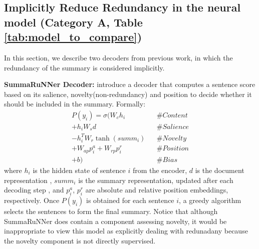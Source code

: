 \documentclass[11pt,a4paper]{article}
\begin{document}
\subsection{Implicitly Reduce Redundancy in the neural model (Category A, Table \ref{tab:model_to_compare})}
In this section, we describe two decoders from previous work, in which the redundancy of the summary is considered implicitly.


\textbf{SummaRuNNer Decoder:}
 introduce
a decoder that computes a sentence score based on its salience, novelty(non-redundancy) and position to decide whether it should be included in the summary.  
Formally: \vspace{-1mm}
\begin{eqnarray*}
P(y_i) = \sigma(W_ch_i & & \# Content\\
        +h_iW_sd& & \# Salience\\
        -h_i^TW_r\tanh(summ_i) & & \# Novelty\\
        +W_{ap}p_i^a+W_{rp}p_i^r & &\# Position\\
        +b) & & \# Bias
\end{eqnarray*}
\vspace{-1mm}
where $h_i$ is the hidden state of sentence $i$ from the encoder, $d$ is the document representation 
, $summ_i$ is the summary representation, updated after each decoding step 
, and $p_i^a$, $p_i^r$ are absolute and relative position embeddings, respectively.
Once $P(y_i)$ is obtained for each sentence $i$, a greedy algorithm selects the sentences to form the final summary. Notice that although SummaRuNNer does contain a component assessing novelty, it would be inappropriate to view this model as explicitly dealing with redunadany because   the novelty component is not directly supervised.
\end{document}
